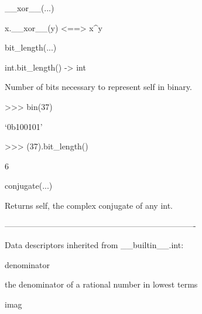 \documentclass[letterpaper,10pt,english]{sphinxmanual}
\begin{document}
\begin{description}
\begin{description}
\begin{DUlineblock}{0em}
\begin{DUlineblock}{\DUlineblockindent}
\item[] 
\end{DUlineblock}
\item[] \_\_xor\_\_(...)
\item[]
\begin{DUlineblock}{\DUlineblockindent}
\item[] x.\_\_xor\_\_(y) \textless{}==\textgreater{} x\textasciicircum{}y
\item[] 
\end{DUlineblock}
\item[] bit\_length(...)
\item[]
\begin{DUlineblock}{\DUlineblockindent}
\item[] int.bit\_length() -\textgreater{} int
\item[] 
\item[] Number of bits necessary to represent self in binary.
\item[] \textgreater{}\textgreater{}\textgreater{} bin(37)
\item[] `0b100101'
\item[] \textgreater{}\textgreater{}\textgreater{} (37).bit\_length()
\item[] 6
\item[] 
\end{DUlineblock}
\item[] conjugate(...)
\item[]
\begin{DUlineblock}{\DUlineblockindent}
\item[] Returns self, the complex conjugate of any int.
\item[] 
\end{DUlineblock}
\item[] ----------------------------------------------------------------------
\item[] Data descriptors inherited from \_\_builtin\_\_.int:
\item[] 
\item[] denominator
\item[]
\begin{DUlineblock}{\DUlineblockindent}
\item[] the denominator of a rational number in lowest terms
\item[] 
\end{DUlineblock}
\item[] imag
\item[]
\begin{DUlineblock}{\DUlineblockindent}

\end{DUlineblock}
\end{DUlineblock}
\end{description}
\end{description}
\end{document}
